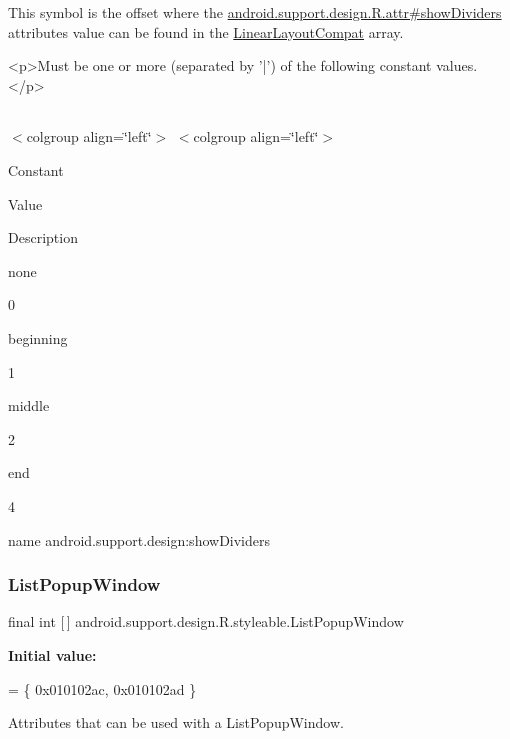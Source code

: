 This symbol is the offset where the \hyperlink{classandroid_1_1support_1_1design_1_1R_1_1attr_a1f12216785c0071388c469052f16e508}{android.\+support.\+design.\+R.\+attr\#show\+Dividers} attribute\textquotesingle{}s value can be found in the \hyperlink{classandroid_1_1support_1_1design_1_1R_1_1styleable_a00b7e2da5bc1f659d80ac76716119713}{Linear\+Layout\+Compat} array.

\begin{DoxyVerb}      <p>Must be one or more (separated by '|') of the following constant values.</p>
\end{DoxyVerb}
 \tabulinesep=1mm
\begin{longtabu} spread 0pt [c]{*{0}{|X[-1]}|}
\hline
\end{longtabu}
$<$colgroup align=\char`\"{}left\char`\"{}$>$ $<$colgroup align=\char`\"{}left\char`\"{}$>$ 

Constant

Value

Description 

{\ttfamily none}

0

{\ttfamily beginning}

1

{\ttfamily middle}

2

{\ttfamily end}

4

name android.\+support.\+design\+:show\+Dividers \mbox{\label{classandroid_1_1support_1_1design_1_1R_1_1styleable_a90ef2283a7dff64bc22eed53a9aa1a73}} 
\subsubsection{\texorpdfstring{List\+Popup\+Window}{ListPopupWindow}}
{\footnotesize\ttfamily final int \mbox{[}$\,$\mbox{]} android.\+support.\+design.\+R.\+styleable.\+List\+Popup\+Window\hspace{0.3cm}{\ttfamily [static]}}

{\bfseries Initial value\+:}
\begin{DoxyCode}
= \{
            0x010102ac, 0x010102ad
        \}
\end{DoxyCode}
Attributes that can be used with a List\+Popup\+Window. 

